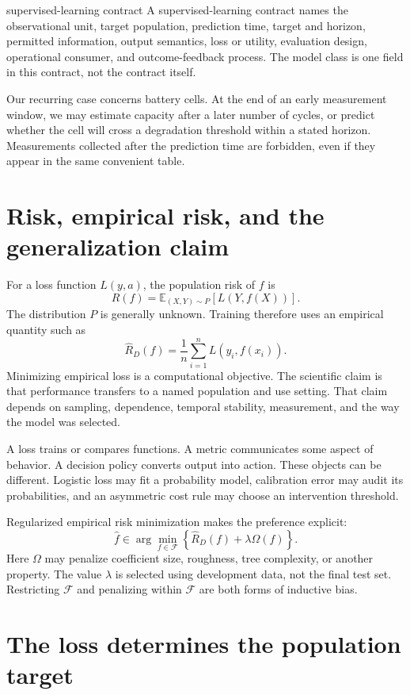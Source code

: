 \begin{definitionbox}{supervised-learning contract}
A supervised-learning contract names the observational unit, target population,
prediction time, target and horizon, permitted information, output semantics,
loss or utility, evaluation design, operational consumer, and outcome-feedback
process. The model class is one field in this contract, not the contract itself.
\end{definitionbox}

Our recurring case concerns battery cells. At the end of an early measurement
window, we may estimate capacity after a later number of cycles, or predict
whether the cell will cross a degradation threshold within a stated horizon.
Measurements collected after the prediction time are forbidden, even if they
appear in the same convenient table.

\section{Risk, empirical risk, and the generalization claim}

For a loss function $L(y,a)$, the population risk of $f$ is
\[
R(f)=\mathbb{E}_{(X,Y)\sim P}[L(Y,f(X))].
\]
The distribution $P$ is generally unknown. Training therefore uses an empirical
quantity such as
\[
\widehat R_D(f)=\frac{1}{n}\sum_{i=1}^n L(y_i,f(x_i)).
\]
Minimizing empirical loss is a computational objective. The scientific claim
is that performance transfers to a named population and use setting. That claim
depends on sampling, dependence, temporal stability, measurement, and the way
the model was selected.

A loss trains or compares functions. A metric communicates some aspect of
behavior. A decision policy converts output into action. These objects can be
different. Logistic loss may fit a probability model, calibration error may
audit its probabilities, and an asymmetric cost rule may choose an intervention
threshold.

Regularized empirical risk minimization makes the preference explicit:
\[
\widehat f\in\arg\min_{f\in\mathcal{F}}
\left\{\widehat R_D(f)+\lambda\Omega(f)\right\}.
\]
Here $\Omega$ may penalize coefficient size, roughness, tree complexity, or
another property. The value $\lambda$ is selected using development data, not
the final test set. Restricting $\mathcal{F}$ and penalizing within
$\mathcal{F}$ are both forms of inductive bias.

\section{The loss determines the population target}

